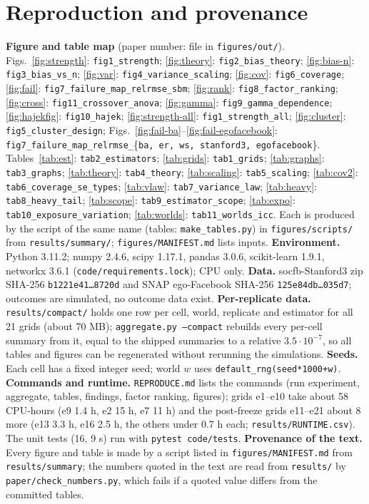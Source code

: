 \section{Reproduction and provenance}
\label{app:repro}
\textbf{Figure and table map} (paper number: file in \texttt{figures/out/}). Figs.~\ref{fig:strength}: \texttt{fig1\_strength}; \ref{fig:theory}: \texttt{fig2\_bias\_theory}; \ref{fig:bias-n}: \texttt{fig3\_bias\_vs\_n}; \ref{fig:var}: \texttt{fig4\_variance\_scaling}; \ref{fig:cov}: \texttt{fig6\_coverage}; \ref{fig:fail}: \texttt{fig7\_failure\_map\_relrmse\_sbm}; \ref{fig:rank}: \texttt{fig8\_factor\_ranking}; \ref{fig:cross}: \texttt{fig11\_crossover\_anova}; \ref{fig:gamma}: \texttt{fig9\_gamma\_dependence}; \ref{fig:hajekfig}: \texttt{fig10\_hajek}; \ref{fig:strength-all}: \texttt{fig1\_strength\_all}; \ref{fig:cluster}: \texttt{fig5\_cluster\_design}; Figs.~\ref{fig:fail-ba}--\ref{fig:fail-egofacebook}: \texttt{fig7\_failure\_map\_relrmse\_}\{\texttt{ba, er, ws, stanford3, egofacebook}\}. Tables~\ref{tab:est}: \texttt{tab2\_estimators}; \ref{tab:grids}: \texttt{tab1\_grids}; \ref{tab:graphs}: \texttt{tab3\_graphs}; \ref{tab:theory}: \texttt{tab4\_theory}; \ref{tab:scaling}: \texttt{tab5\_scaling}; \ref{tab:cov2}: \texttt{tab6\_coverage\_se\_types}; \ref{tab:vlaw}: \texttt{tab7\_variance\_law}; \ref{tab:heavy}: \texttt{tab8\_heavy\_tail}; \ref{tab:scope}: \texttt{tab9\_estimator\_scope}; \ref{tab:expo}: \texttt{tab10\_exposure\_variation}; \ref{tab:worlds}: \texttt{tab11\_worlds\_icc}. Each is produced by the script of the same name (tables: \texttt{make\_tables.py}) in \texttt{figures/scripts/} from \texttt{results/summary/}; \texttt{figures/MANIFEST.md} lists inputs. \textbf{Environment.} Python 3.11.2; numpy 2.4.6, scipy 1.17.1, pandas 3.0.6, scikit-learn 1.9.1, networkx 3.6.1 (\texttt{code/requirements.lock}); CPU only. \textbf{Data.} socfb-Stanford3 zip SHA-256 \texttt{b1221e41\dots8720d} and SNAP ego-Facebook SHA-256 \texttt{125e84db\dots035d7}; outcomes are simulated, no outcome data exist. \textbf{Per-replicate data.} \texttt{results/compact/} holds one row per cell, world, replicate and estimator for all 21 grids (about 70 MB); \texttt{aggregate.py --compact} rebuilds every per-cell summary from it, equal to the shipped summaries to a relative $3.5\cdot10^{-7}$, so all tables and figures can be regenerated without rerunning the simulations. \textbf{Seeds.} Each cell has a fixed integer seed; world $w$ uses \texttt{default\_rng(seed*1000+w)}. \textbf{Commands and runtime.} \texttt{REPRODUCE.md} lists the commands (run experiment, aggregate, tables, findings, factor ranking, figures); grids e1--e10 take about 58 CPU-hours (e9 1.4 h, e2 15 h, e7 11 h) and the post-freeze grids e11--e21 about 8 more (e13 3.3 h, e16 2.5 h, the others under 0.7 h each; \texttt{results/RUNTIME.csv}). The unit tests (16, 9 s) run with \texttt{pytest code/tests}. \textbf{Provenance of the text.} Every figure and table is made by a script listed in \texttt{figures/MANIFEST.md} from \texttt{results/summary}; the numbers quoted in the text are read from \texttt{results/} by \texttt{paper/check\_numbers.py}, which fails if a quoted value differs from the committed tables.

